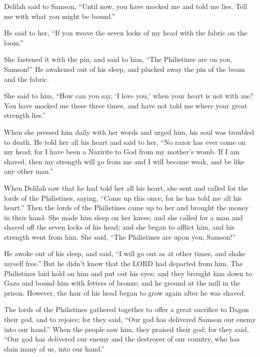 \myverse{}Delilah said to Samson, “Until now, you have mocked me and told
me lies. Tell me with what you might be bound.”

He said to her, “If you weave the seven locks of my head with the fabric on the loom.”

\myverse{}She fastened it with the pin, and said to him, “The Philistines
are on you, Samson!” He awakened out of his sleep, and plucked away the pin of the beam and the fabric.

\myverse{}She said to him, “How can you say, ‘I love you,’ when your heart
is not with me? You have mocked me these three times, and have not told me where your great strength lies.”

\myverse{}When she pressed him daily with her words and urged him, his
soul was troubled to death.
\myverse{}He told her all his heart and said to her, “No razor has ever come on my
head; for I have been a Nazirite to God from my mother’s womb. If I am shaved, then my strength will go
from me and I will become weak, and be like any other man.”

\myverse{}When Delilah saw that he had told her all his heart, she sent
and called for the lords of the Philistines, saying, “Come up this once, for he has told me all his heart.”
Then the lords of the Philistines came up to her and brought the money in their hand.
\myverse{}She made him sleep on her knees; and she called for a man and shaved off
the seven locks of his head; and she began to afflict him, and his strength went from him.
\myverse{}She said, “The Philistines are upon you, Samson!”

He awoke out of his sleep, and said, “I will go out as at other times, and shake myself free.”
But he didn’t know that the LORD had departed from him.
\myverse{}The Philistines laid hold on him and put out his eyes; and they brought him
down to Gaza and bound him with fetters of bronze; and he ground at the mill in the prison.
\myverse{}However, the hair of his head began to grow again after he was shaved.

\myverse{}The lords of the Philistines gathered together to offer a great
sacrifice to Dagon their god, and to rejoice; for they said, “Our god has delivered Samson our enemy into
our hand.”
\myverse{}When the people saw him, they praised their god; for they said, “Our god
has delivered our enemy and the destroyer of our country, who has slain many of us, into our hand.”

